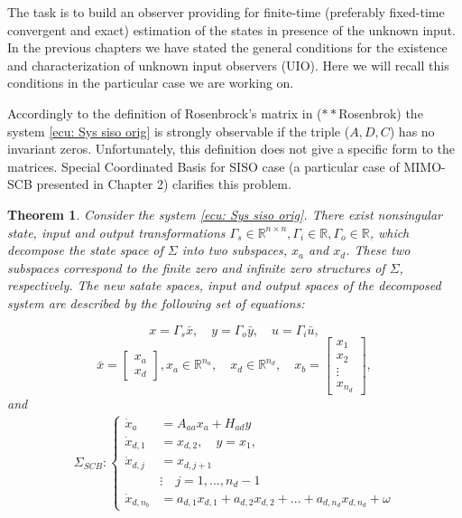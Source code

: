 \documentclass[11pt,letterpaper,twoside,openright]{report}
\newcommand{\RE}{\mathbb{R}}
\newtheorem{theorem}{Theorem}[chapter]
\begin{document}
The task is to build an observer providing for finite-time (preferably fixed-time convergent and exact) estimation of the states in presence of the unknown input. In the previous chapters we have stated the general conditions for the existence and characterization of unknown input observers (UIO). Here we will recall this conditions in the particular case we are working on.

Accordingly to the definition of Rosenbrock's matrix in ($**$Rosenbrok) the system \eqref{ecu: Sys siso orig} is strongly observable if the triple ($A,D,C$) has no invariant zeros. Unfortunately, this definition does not give a specific form to the matrices. Special Coordinated Basis for SISO case (a particular case of MIMO-SCB presented in Chapter 2) clarifies this problem.

\begin{theorem}\label{theo: SCB SISO}
	Consider the system \eqref{ecu: Sys siso orig}. There exist nonsingular state, input and output transformations $\Gamma_s\in \RE^{n\times n},\Gamma_i\in \RE,\Gamma_o\in \RE$, which decompose the state space of $\Sigma$ into two subspaces, $x_a$ and $x_d$. These two subspaces correspond to the finite zero and infinite zero structures of $\Sigma$, respectively. The new satate spaces, input and output spaces of the decomposed system are described by the following set of equations:
	
	\begin{equation}\label{ecu: Transf SCB}
		x=\Gamma_s\bar{x}, \quad y=\Gamma_o\bar{y}, \quad u=\Gamma_i\bar{u},
	\end{equation}
	\begin{equation}
		\bar{x}=
		\begin{bmatrix}
			x_a \\
			x_d
		\end{bmatrix}, x_a \in \mathbb{R}^{n_a}, \quad x_d \in \mathbb{R}^{n_d},\quad x_b=
		\begin{bmatrix}
			x_{1} \\
			x_{2} \\
			\vdots \\
			x_{n_d}
		\end{bmatrix},
	\end{equation}
	and
	\begin{equation}
		\begin{split}\label{ecu: SISO SCB sys}
		\Sigma_{SCB}: \left\{
			\begin{array}{rl}
			\dot{x}_a &= A_{aa}x_a + H_{ad}y\\
			\dot{x}_{d,1} &= x_{d,2}, \quad y=x_{1}, \\
			\dot{x}_{d,j} &= x_{d,j+1} \\
			& \vdots \quad j=1,...,n_{d}-1\\
			\dot{x}_{d,n_{b}} &= a_{d,1}x_{d,1} + a_{d,2}x_{d,2} +...+ a_{d,n_d}x_{d,n_d} + \omega
			\end{array}
		\right. \\
		\end{split}
	\end{equation}
\end{theorem}
\end{document}
